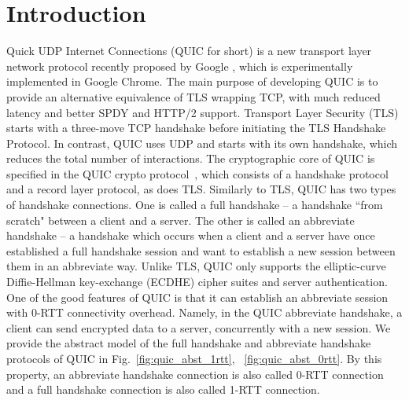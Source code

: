 \section{Introduction} \label{sec:intro}
Quick UDP Internet Connections (QUIC for short) is a
new transport layer network protocol recently proposed
by Google \cite{QUIC,QUICDraft}, which is experimentally
implemented in Google Chrome.
The main purpose of developing QUIC is to provide an
alternative equivalence of TLS wrapping TCP, with much
reduced latency and better SPDY and HTTP/2 support.
Transport Layer Security (TLS) starts with a three-move
TCP handshake before initiating the TLS Handshake
Protocol.
In contrast, QUIC uses UDP and starts with its own
handshake, which reduces the total number of
interactions.
The cryptographic core of QUIC is specified in the QUIC
crypto protocol~\cite{QUIC:Crypto}, which consists of a
handshake protocol and a record layer protocol, as does
TLS.
Similarly to TLS, QUIC has two types of handshake
connections.
One is called a full handshake -- a handshake
``from scratch" between a client and a server.
The other is called an abbreviate handshake -- a
handshake which occurs when a client and a server have
once established a full handshake session and want to
establish a new session between them in an abbreviate way.
Unlike TLS, QUIC only supports the elliptic-curve
Diffie-Hellman key-exchange (ECDHE) cipher suites and
server authentication.
%
One of the good features of QUIC is that it can
establish an abbreviate session with $0$-RTT
connectivity overhead.
Namely, in the QUIC abbreviate handshake, a client can send
encrypted data to a server, concurrently with a new session.
We provide the abstract model of the full handshake and
abbreviate handshake protocols of QUIC in
Fig.~\ref{fig:quic_abst_1rtt}, ~\ref{fig:quic_abst_0rtt}.
By this property, an abbreviate handshake connection is also called
0-RTT connection and a full handshake connection is also called
1-RTT connection.

